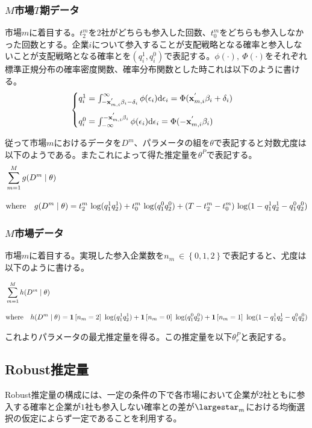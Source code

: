 \documentclass{jsarticle}
\begin{document}
\subsubsection{$M$市場$T$期データ}
市場$m$に着目する。$t_2^m$を2社がどちらも参入した回数、$t_0^m$をどちらも参入しなかった回数とする。企業$i$について参入することが支配戦略となる確率と参入しないことが支配戦略となる確率とを$(q_i^1, q_i^0)$で表記する。$\phi(\cdot),\ \Phi(\cdot)$をそれぞれ標準正規分布の確率密度関数、確率分布関数とした時これは以下のように書ける。
\begin{align*}
\begin{cases}
	q_i^1 = \int_{-{\bf x}_{m, i}^{'} \beta_i - \delta_i}^{\infty} \phi(\epsilon_i) \mathrm{d}\epsilon_i = \Phi({\bf x}_{m, i}^{'} \beta_i + \delta_i)\\[10pt]
	q_i^0 = \int_{-\infty}^{-{\bf x}_{m, i}^{'} \beta_i} \phi(\epsilon_i) \mathrm{d}\epsilon_i = \Phi(-{\bf x}_{m, i}^{'} \beta_i)
\end{cases}
\end{align*}

従って市場$m$におけるデータを$D^m$、パラメータの組を$\theta$で表記すると対数尤度は以下のようである。またこれによって得た推定量を$\theta^P$で表記する。
\begin{align*}
	&\sum_{m = 1}^M g(D^m \mid \theta)\\[10pt]
	&\text{where}\quad g(D^m \mid \theta) = t_2^m\ {\rm log} (q_1^1 q_2^1) + t_0^m\ {\rm log} (q_1^0 q_2^0) + (T - t_2^m - t_0^m)\ {\rm log} (1- q_1^1 q_2^1 - q_1^0 q_2^0)
\end{align*}

\subsubsection{$M$市場データ}
市場$m$に着目する。実現した参入企業数を$n_m\ \in \left\{ 0,1,2 \right\}$で表記すると、尤度は以下のように書ける。

\begin{align*}
	&\sum_{m = 1}^M h(D^m \mid \theta)\\[10pt]
	&\text{where}\quad h(D^m \mid \theta) = {\bf 1}\left[ n_m = 2 \right]\ {\rm log} (q_1^1 q_2^1) + {\bf 1}\left[ n_m = 0 \right]\ {\rm log} (q_1^0 q_2^0) + {\bf 1}\left[ n_m = 1 \right]\ {\rm log} (1- q_1^1 q_2^1 - q_1^0 q_2^0)
\end{align*}

これよりパラメータの最尤推定量を得る。この推定量を以下$\theta_r^P$と表記する。


\subsection{Robust推定量}
Robust推定量の構成には、一定の条件の下で各市場において企業が$2$社ともに参入する確率と企業が$1$社も参入しない確率との差が$\largestar_m$における均衡選択の仮定によらず一定であることを利用する。
\end{document}
